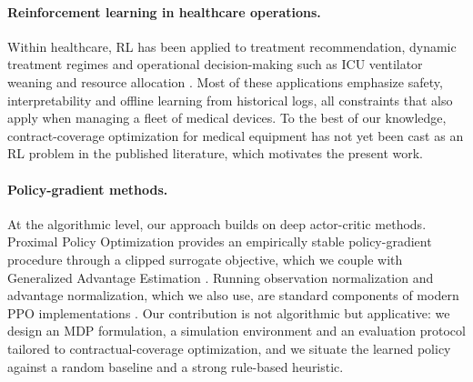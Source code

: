 \paragraph{Reinforcement learning in healthcare operations.}
Within healthcare, RL has been applied to treatment recommendation, dynamic
treatment regimes and operational decision-making such as ICU ventilator
weaning and resource allocation \cite{yu2021reinforcement}. Most of these
applications emphasize safety, interpretability and offline learning from
historical logs, all constraints that also apply when managing a fleet of
medical devices. To the best of our knowledge, contract-coverage
optimization for medical equipment has not yet been cast as an RL problem in
the published literature, which motivates the present work.


\paragraph{Policy-gradient methods.}
At the algorithmic level, our approach builds on deep actor-critic methods.
Proximal Policy Optimization \cite{schulman2017ppo} provides an empirically
stable policy-gradient procedure through a clipped surrogate objective,
which we couple with Generalized Advantage Estimation
\cite{schulman2016gae}. Running observation normalization and advantage
normalization, which we also use, are standard components of modern PPO
implementations \cite{andrychowicz2021matters}. Our contribution is not
algorithmic but applicative: we design an MDP formulation, a simulation
environment and an evaluation protocol tailored to contractual-coverage
optimization, and we situate the learned policy against a random baseline
and a strong rule-based heuristic.
